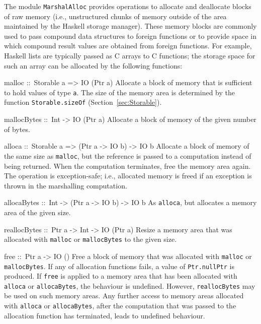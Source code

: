 \documentclass[a4paper,twosides]{article}
\makeatletter
\newcommand{\code}[1]{\texttt{#1}}      %
\newenvironment{codedesc}{%
  \list{}{\labelwidth\z@
    \let\makelabel\codedesclabel}
  }{%
  \endlist
  }
\newcommand*{\codedesclabel}[1]{%
  \hspace{-\leftmargin}
  \parbox[b]{\labelwidth}{\makebox[0pt][l]{\code{#1}}\\}\hfil\relax
  }
\makeatother
\begin{document}
The module \code{MarshalAlloc} provides operations to allocate and deallocate
blocks of raw memory (i.e., unstructured chunks of memory outside of the area
maintained by the Haskell storage manager).  These memory blocks are commonly
used to pass compound data structures to foreign functions or to provide space
in which compound result values are obtained from foreign functions.  For
example, Haskell lists are typically passed as C arrays to C functions; the
storage space for such an array can be allocated by the following functions:
%
\begin{codedesc}
\item[malloc ::\ Storable a => IO (Ptr a)] Allocate a block of memory that is
  sufficient to hold values of type \code{a}.  The size of the memory area is
  determined by the function \code{Storable.sizeOf}
  (Section~\ref{sec:Storable}).

\item[mallocBytes ::\ Int -> IO (Ptr a)] Allocate a block of memory of the
  given number of bytes.
  
\item[alloca ::\ Storable a => (Ptr a -> IO b) -> IO b] Allocate a block of
  memory of the same size as \code{malloc}, but the reference is passed to a
  computation instead of being returned.  When the computation terminates,
  free the memory area again.  The operation is exception-safe; i.e.,
  allocated memory is freed if an exception is thrown in the marshalling
  computation.

\item[allocaBytes ::\ Int -> (Ptr a -> IO b) -> IO b] As \code{alloca}, but
  allocates a memory area of the given size.
  
\item[reallocBytes ::\ Ptr a -> Int -> IO (Ptr a)] Resize a memory area that
  was allocated with \code{malloc} or \code{mallocBytes} to the given size.

\item[free ::\ Ptr a -> IO ()] Free a block of memory that was allocated with
  \code{malloc} or \code{mallocBytes}.
\end{codedesc}
%
If any of allocation functions fails, a value of \code{Ptr.nullPtr} is
produced.  If \code{free} is applied to a memory area that has been allocated
with \code{alloca} or \code{allocaBytes}, the behaviour is undefined.
However, \code{reallocBytes} may be used on such memory areas.  Any further
access to memory areas allocated with \code{alloca} or \code{allocaBytes},
after the computation that was passed to the allocation function has
terminated, leads to undefined behaviour.
\end{document}
